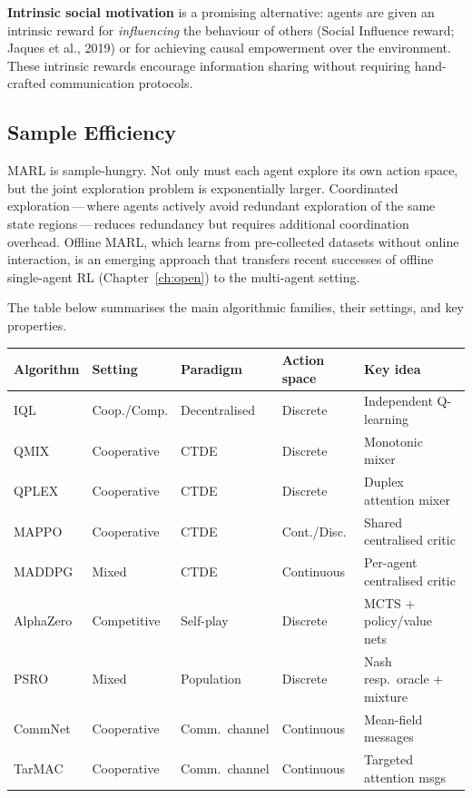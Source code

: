 \textbf{Intrinsic social motivation}
is a promising alternative: agents are given an intrinsic reward
for \emph{influencing} the behaviour of others (Social Influence
reward; Jaques et al., 2019) or for achieving causal empowerment
over the environment. These intrinsic rewards encourage information
sharing without requiring hand-crafted communication protocols.

\subsection{Sample Efficiency}

MARL is sample-hungry. Not only must each agent explore its own
action space, but the joint exploration problem is exponentially
larger. Coordinated exploration\,---\,where agents actively
avoid redundant exploration of the same state regions\,---\,reduces
redundancy but requires additional coordination overhead. Offline
MARL, which learns from pre-collected datasets
without online interaction, is an emerging approach that transfers
recent successes of offline single-agent RL
(Chapter~\ref{ch:open}) to the multi-agent setting.

The table below summarises the main algorithmic families,
their settings, and key properties.

\begin{center}
\small
\begin{tabular}{@{}lllll@{}}
\toprule
\textbf{Algorithm} & \textbf{Setting} & \textbf{Paradigm}
  & \textbf{Action space} & \textbf{Key idea} \\
\midrule
IQL & Coop./Comp. & Decentralised & Discrete & Independent Q-learning \\
QMIX & Cooperative & CTDE & Discrete & Monotonic mixer \\
QPLEX & Cooperative & CTDE & Discrete & Duplex attention mixer \\
MAPPO & Cooperative & CTDE & Cont./Disc. & Shared centralised critic \\
MADDPG & Mixed & CTDE & Continuous & Per-agent centralised critic \\
AlphaZero & Competitive & Self-play & Discrete & MCTS + policy/value nets \\
PSRO & Mixed & Population & Discrete & Nash resp.\ oracle + mixture \\
CommNet & Cooperative & Comm.\ channel & Continuous & Mean-field messages \\
TarMAC & Cooperative & Comm.\ channel & Continuous & Targeted attention msgs \\
\bottomrule
\end{tabular}
\end{center}

